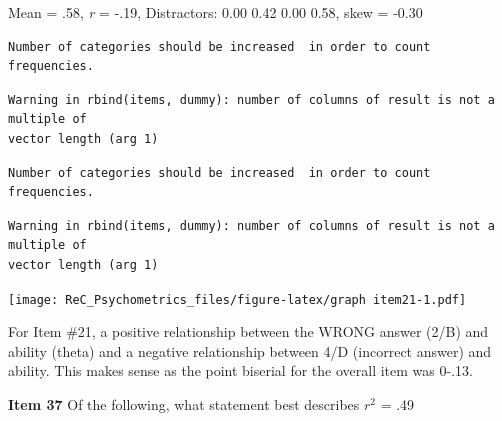 \documentclass[
  english,
]{book}
\newenvironment{Shaded}{\begin{snugshade}}{\end{snugshade}}
\newcommand{\DataTypeTok}[1]{\textcolor[rgb]{0.13,0.29,0.53}{#1}}
\newcommand{\DecValTok}[1]{\textcolor[rgb]{0.00,0.00,0.81}{#1}}
\newcommand{\KeywordTok}[1]{\textcolor[rgb]{0.13,0.29,0.53}{\textbf{#1}}}
\newcommand{\NormalTok}[1]{#1}
\newcommand{\OperatorTok}[1]{\textcolor[rgb]{0.81,0.36,0.00}{\textbf{#1}}}
\begin{document}
Mean = .58, \emph{r} = -.19, Distractors: 0.00 0.42 0.00 0.58, skew = -0.30

\begin{Shaded}
\end{Shaded}

\begin{verbatim}
Number of categories should be increased  in order to count frequencies. 
\end{verbatim}

\begin{verbatim}
Warning in rbind(items, dummy): number of columns of result is not a multiple of
vector length (arg 1)
\end{verbatim}

\begin{verbatim}
Number of categories should be increased  in order to count frequencies. 
\end{verbatim}

\begin{verbatim}
Warning in rbind(items, dummy): number of columns of result is not a multiple of
vector length (arg 1)
\end{verbatim}

\texttt{[image: ReC\_Psychometrics\_files/figure-latex/graph item21-1.pdf]}

For Item \#21, a positive relationship between the WRONG answer (2/B) and ability (theta) and a negative relationship between 4/D (incorrect answer) and ability. This makes sense as the point biserial for the overall item was 0-.13.

\textbf{Item 37} Of the following, what statement best describes \(r^2\) = .49
\end{document}
